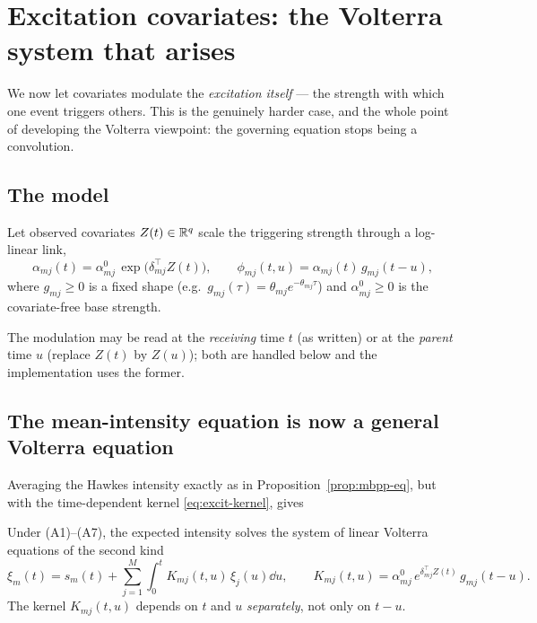 \section{Excitation covariates: the Volterra system that arises}
\label{sec:excitation-cov}

We now let covariates modulate the \emph{excitation itself} --- the strength with
which one event triggers others. This is the genuinely harder case, and the whole
point of developing the Volterra viewpoint: the governing equation stops being a
convolution.

\subsection{The model}

\begin{model}\label{mod:excitation}
Let observed covariates $Z(t)\in\mathbb{R}^q$ scale the triggering strength through a
log-linear link,
\begin{equation}
\alpha_{mj}(t)=\alpha^{0}_{mj}\,\exp\!\bigl(\delta_{mj}^{\top}Z(t)\bigr),
\qquad
\phi_{mj}(t,u)=\alpha_{mj}(t)\,g_{mj}(t-u),
\label{eq:excit-kernel}
\end{equation}
where $g_{mj}\ge0$ is a fixed shape (e.g.\ $g_{mj}(\tau)=\theta_{mj}e^{-\theta_{mj}\tau}$)
and $\alpha^0_{mj}\ge0$ is the covariate-free base strength.
\end{model}

The modulation may be read at the \emph{receiving} time $t$ (as written) or at the
\emph{parent} time $u$ (replace $Z(t)$ by $Z(u)$); both are handled below and the
implementation uses the former.

\subsection{The mean-intensity equation is now a general Volterra equation}

Averaging the Hawkes intensity exactly as in Proposition~\ref{prop:mbpp-eq}, but
with the time-dependent kernel \eqref{eq:excit-kernel}, gives

\begin{proposition}\label{prop:nonconv}
Under (A1)--(A7), the expected intensity solves the system of linear Volterra
equations of the second kind
\begin{equation}
\xi_m(t)=s_m(t)+\sum_{j=1}^M\int_0^t K_{mj}(t,u)\,\xi_j(u)\dd u,
\qquad
K_{mj}(t,u)=\alpha^0_{mj}\,e^{\delta_{mj}^\top Z(t)}\,g_{mj}(t-u).
\label{eq:mbpp-nonconv}
\end{equation}
The kernel $K_{mj}(t,u)$ depends on $t$ and $u$ \emph{separately}, not only on
$t-u$.
\end{proposition}

